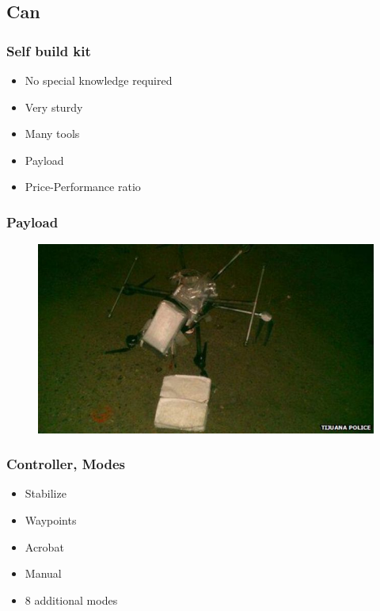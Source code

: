 \subsection{Can}

\begin{frame}
\frametitle{Self build kit}

  \begin{itemize}
    \item No special knowledge required    
	\item Very sturdy
	\item Many tools
	\item Payload    
	\item Price-Performance ratio
  \end{itemize}
  
\end{frame}



\begin{frame}
\frametitle{Payload}

  \begin{figure}
  \includegraphics[scale=0.6]{pic/03_our-copter/drug.jpg}
  \end{figure}
  
\end{frame}



\begin{frame}
\frametitle{Controller, Modes}

  \begin{itemize}
    \item Stabilize    
    \item Waypoints   
	\item Acrobat
	\item Manual 
	\item 8 additional modes 
  \end{itemize}
  
\end{frame}



